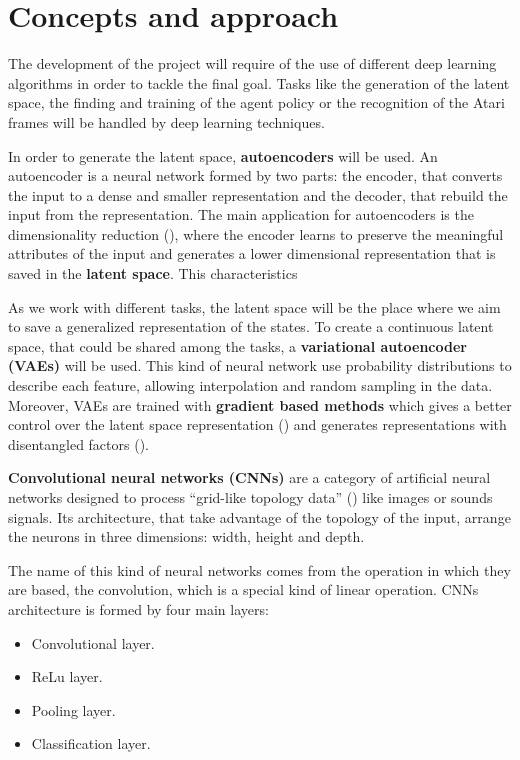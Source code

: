 \section{Concepts and approach}

The development of the project will require of the use of different deep learning algorithms in order to tackle the final goal. Tasks like the generation of the latent space, the finding and training of the agent policy or the recognition of the Atari frames will be handled by deep learning techniques.

In order to generate the latent space, \textbf{autoencoders} will be used. An autoencoder is a neural network formed by two parts: the encoder, that converts the input to a dense and smaller representation and the decoder, that rebuild the input from the representation. The main application for autoencoders is the dimensionality reduction (\cite{Hinton504}), where the encoder learns to preserve the meaningful attributes of the input and generates a lower dimensional representation that is saved in the \textbf{latent space}. This characteristics  

As we work with different tasks, the latent space will be the place where we aim to save a generalized representation of the states. To create a continuous latent space, that could be shared among the tasks, a \textbf{variational autoencoder (VAEs)} will be used. This kind of neural network use probability distributions to describe each feature, allowing interpolation and random sampling in the data. Moreover, VAEs are trained with \textbf{gradient based methods} which gives a better control over the latent space representation (\cite{goodfellow2016deep}) and generates representations with disentangled factors (\cite{2016arXiv160605579H}).

\textbf{Convolutional neural networks (CNNs)} are a category of artificial neural networks designed to process ``grid-like topology data'' (\cite{goodfellow2016deep}) like images or sounds signals. Its architecture, that take advantage of the topology of the input, arrange the neurons in three dimensions: width, height and depth. 

The name of this kind of neural networks comes from the operation in which they are based, the convolution, which is a special kind of linear operation. CNNs architecture is formed by four main layers:

\begin{itemize}
    \item Convolutional layer.
    \item ReLu layer.
    \item Pooling layer.
    \item Classification layer.
\end{itemize}

